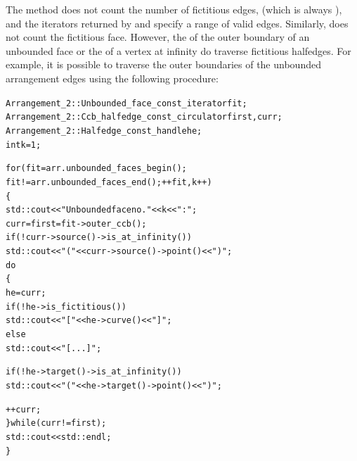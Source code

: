 \begin{ccAdvanced}
The method  does not count the number of
fictitious edges, (which is always
), and the iterators
returned by  and  specify
a range of valid edges. Similarly,  does not
count the fictitious face.
However, the  of the outer boundary of an
unbounded face or the  of a vertex
at infinity do traverse fictitious halfedges. For example, it is possible
to traverse the outer boundaries of the unbounded arrangement edges
using the following procedure:
\begin{alltt}
  Arrangement_2::Unbounded_face_const_iterator  fit;
  Arrangement_2::Ccb_halfedge_const_circulator  first, curr;
  Arrangement_2::Halfedge_const_handle          he;
  int                                           k = 1;

  for (fit = arr.unbounded_faces_begin();
       fit != arr.unbounded_faces_end(); ++fit, k++)
  \{
    std::cout << "Unbounded face no. " << k << ": ";
    curr = first = fit->outer_ccb();
    if (! curr->source()->is_at_infinity())
      std::cout << "(" << curr->source()->point() << ")";
    do
    \{
      he = curr;
      if (! he->is_fictitious())
        std::cout << "   [" << he->curve() << "]   ";
      else
        std::cout << "   [ ... ]   ";

      if (! he->target()->is_at_infinity())
        std::cout << "(" << he->target()->point() << ")";

      ++curr;
    \} while (curr != first);
    std::cout << std::endl;
  \}
\end{alltt}

\end{ccAdvanced}

